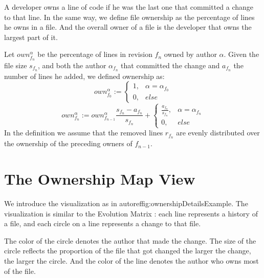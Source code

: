 \documentclass[10pt]{book}
\begin{document}
A developer owns a line of code if he was the last one that committed a change to that line. In the same way, we define file ownership as the percentage of lines he owns in a file. And the overall owner of a file is the developer that owns the largest part of it.

Let $own_{f_n}^\alpha$ be the percentage of lines in revision $f_n$ owned by author $\alpha$. Given the file size $s_{f_n}$, and both the author $\alpha_{f_n}$ that committed the change and $a_{f_n}$ the number of lines he added, we defined ownership as:
\[
own_{f_0}^\alpha:=\left\{
    \begin{array}{cl}
        1, & \alpha=\alpha_{f_0} \\
        0, & else
    \end{array}\right.
\]
\[
own_{f_n}^\alpha:=own_{f_{n-1}}^\alpha \frac{s_{f_n} - a_{f_n}}{s_{f_n}} + \left\{
    \begin{array}{cl}
        \frac{a_{f_n}}{s_{f_n}}, & \alpha=\alpha_{f_n} \\
        0, & else
    \end{array}\right.
\]
In the definition we assume that the removed lines $r_{f_n}$ are evenly distributed over the ownership of the preceding owners of $f_{n-1}$.

\section{The Ownership Map View}\label{sec:approach}

We introduce the \omap visualization as in autoref{fig:ownershipDetailsExample}. The visualization is similar to the Evolution Matrix \cite{Lanz02a}: each line represents a history of a file, and each circle on a line represents a change to that file.

The color of the circle denotes the author that made the change. The size of the circle reflects the proportion of the file that got changed \ie the larger the change, the larger the circle. And the color of the line denotes the author who owns most of the file.
\end{document}
